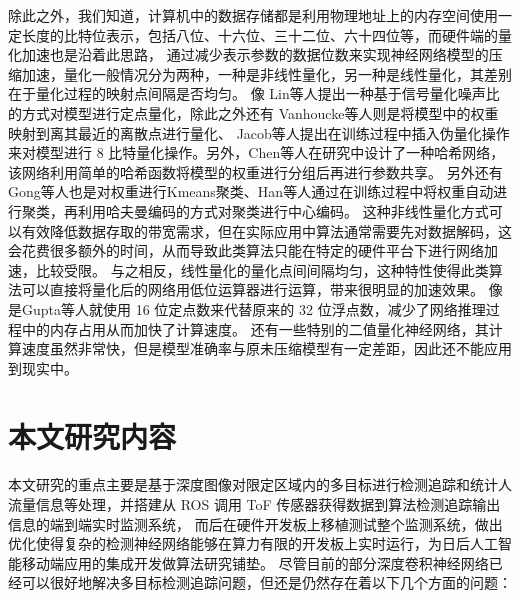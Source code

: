 除此之外，我们知道，计算机中的数据存储都是利用物理地址上的内存空间使用一定长度的比特位表示，包括八位、十六位、三十二位、六十四位等，而硬件端的量化加速也是沿着此思路，
通过减少表示参数的数据位数来实现神经网络模型的压缩加速，量化一般情况分为两种，一种是非线性量化，另一种是线性量化，其差别在于量化过程的映射点间隔是否均匀。
像 Lin等人\cite{83}提出一种基于信号量化噪声比的方式对模型进行定点量化，除此之外还有 Vanhoucke等人\cite{84}则是将模型中的权重映射到离其最近的离散点进行量化、
Jacob等人\cite{85}提出在训练过程中插入伪量化操作来对模型进行 8 比特量化操作。另外，Chen等人\cite{86}在研究中设计了一种哈希网络，该网络利用简单的哈希函数将模型的权重进行分组后再进行参数共享。
另外还有 Gong等人\cite{87}也是对权重进行Kmeans聚类、Han等人\cite{75}通过在训练过程中将权重自动进行聚类，再利用哈夫曼编码的方式对聚类进行中心编码。
这种非线性量化方式可以有效降低数据存取的带宽需求，但在实际应用中算法通常需要先对数据解码，这会花费很多额外的时间，从而导致此类算法只能在特定的硬件平台下进行网络加速，比较受限。
与之相反，线性量化的量化点间间隔均匀，这种特性使得此类算法可以直接将量化后的网络用低位运算器进行运算，带来很明显的加速效果。
像是Gupta等人\cite{88}就使用 16 位定点数来代替原来的 32 位浮点数，减少了网络推理过程中的内存占用从而加快了计算速度。
还有一些特别的二值量化神经网络\cite{89,90}，其计算速度虽然非常快，但是模型准确率与原未压缩模型有一定差距，因此还不能应用到现实中。

\section{本文研究内容}

本文研究的重点主要是基于深度图像对限定区域内的多目标进行检测追踪和统计人流量信息等处理，并搭建从 ROS 调用 ToF 传感器获得数据到算法检测追踪输出信息的端到端实时监测系统，
而后在硬件开发板上移植测试整个监测系统，做出优化使得复杂的检测神经网络能够在算力有限的开发板上实时运行，为日后人工智能移动端应用的集成开发做算法研究铺垫。
尽管目前的部分深度卷积神经网络已经可以很好地解决多目标检测追踪问题，但还是仍然存在着以下几个方面的问题：

